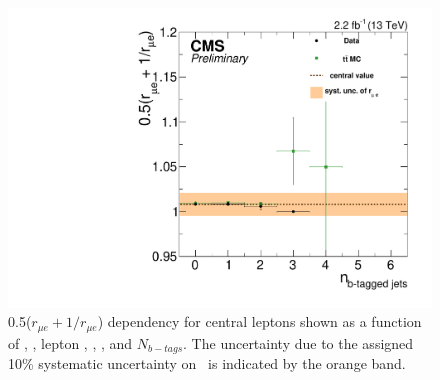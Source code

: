\begin{figure}[htbp]
\begin{minipage}[t]{0.3\textwidth}
  \end{minipage}
  \begin{minipage}[t]{0.3\textwidth}
    \includegraphics[width=\textwidth]{bkgd/figs/rSFOFFromRMuE_ZPeakControlCentral_Run2015_25ns_NBJets_None.pdf}
  \end{minipage}

  \caption{
    0.5($r_{\mu e}+1/r_{\mu e}$) dependency for central leptons shown as a function of \nj, \nvtx, lepton \pt, \mll, \MET, and $N_{b-tags}$.
    The uncertainty due to the assigned 10\% systematic uncertainty on \rmue~is indicated by the orange band.
  }
  \label{fig:RDependencyCentral}
\end{figure}

